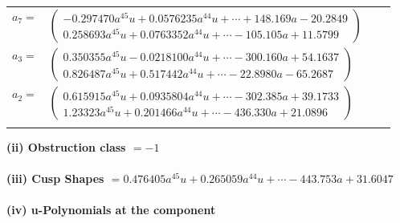 \documentclass[1p]{elsarticle_modified}
\theoremstyle{definition}
\begin{document}
\begin{tabular}{m{7pt} m{180pt} m{7pt} m{180pt} }
\flushright $a_{7}=$&$\begin{pmatrix}-0.297470 a^{45} u+0.0576235 a^{44} u+\cdots+148.169 a-20.2849\\0.258693 a^{45} u+0.0763352 a^{44} u+\cdots-105.105 a+11.5799\end{pmatrix}$ \\
\flushright $a_{3}=$&$\begin{pmatrix}0.350355 a^{45} u-0.0218100 a^{44} u+\cdots-300.160 a+54.1637\\0.826487 a^{45} u+0.517442 a^{44} u+\cdots-22.8980 a-65.2687\end{pmatrix}$ \\
\flushright $a_{2}=$&$\begin{pmatrix}0.615915 a^{45} u+0.0935804 a^{44} u+\cdots-302.385 a+39.1733\\1.23323 a^{45} u+0.201466 a^{44} u+\cdots-436.330 a+21.0896\end{pmatrix}$\\&\end{tabular}
\flushleft \textbf{(ii) Obstruction class $= -1$}\\~\\
\flushleft \textbf{(iii) Cusp Shapes $= 0.476405 a^{45} u+0.265059 a^{44} u+\cdots-443.753 a+31.6047$}\\~\\
\newpage\renewcommand{\arraystretch}{1}
\flushleft \textbf{(iv) u-Polynomials at the component}\newline \\
\end{document}

